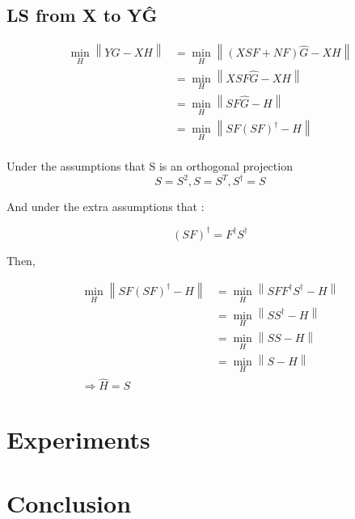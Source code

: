\documentclass{article}
\begin{document}
\subsection{LS from X to Y\^{G}}

\begin{equation}
\begin{aligned}
\min_H \left \| Y \hat G - XH \right \| &= \min_H \left \| (XSF+NF) \hat G - XH \right \| \\
&= \min_H \left \| XSF \hat G - XH \right \| \\
&= \min_H \left \| SF \hat G - H \right \| \\
&= \min_H \left \| SF (SF)^{\dagger} - H \right \| \\
\end{aligned}
\end{equation}

Under the assumptions that S is an orthogonal projection
\begin{equation}
    S = S^2, S=S^T, S^{\dagger} = S
\end{equation}

And under the extra assumptions that :

\begin{equation}
(SF)^{\dagger} = F^{\dagger} S^{\dagger}
\end{equation}

Then,

\begin{equation}
\begin{aligned}
\min_H \left \| SF (SF)^{\dagger} - H \right \| &= \min_H \left \| SFF^{\dagger}S^{\dagger} - H \right \| \\
&= \min_H \left \| SS^{\dagger} - H \right \| \\
&= \min_H \left \| SS - H \right \| \\
&= \min_H \left \| S - H \right \|\\
\Rightarrow \hat H = S
\end{aligned}
\end{equation}


\section{Experiments}

\section{Conclusion}

\clearpage
\newpage



\end{document}

